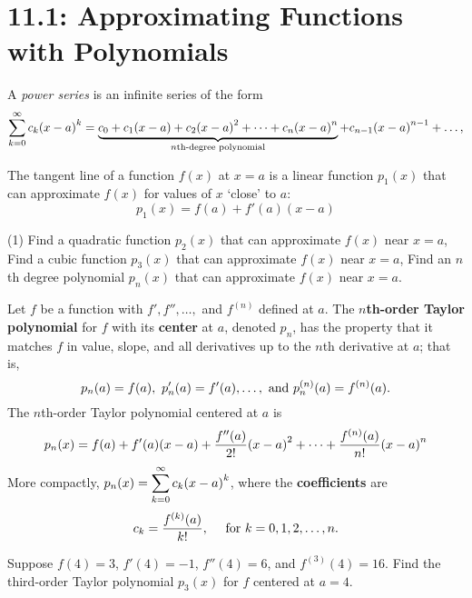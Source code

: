 \documentclass[../mathNotesPreamble]{subfiles}
\begin{document}
  \section{11.1: Approximating Functions with Polynomials}

  A \textit{power series} is an infinite series of the form
    \[\sum_{k=0}^\infty c_k{\left(x-a\right)}^k=\underbrace{c_0+c_1{\left(x-a\right)}+c_2{\left(x-a\right)}^2+\dots+c_n{\left(x-a\right)}^n}_{n\textnormal{th-degree polynomial}}+c_{n-1}{\left(x-a\right)}^{n-1}+\dots,\]
  \begin{ex*}
    The tangent line of a function $f(x)$ at $x=a$ is a linear function $p_1(x)$ that can approximate $f(x)$ for values of $x$ `close' to $a$:
      \[p_1(x)=f(a)+f'(a)(x-a)\]
    \begin{tasks}[after-item-skip=\stretch{1}, label=,item-indent=0pt](1)
      \task Find a quadratic function $p_2(x)$ that can approximate $f(x)$ near $x=a$,
      \task Find a cubic function $p_3(x)$ that can approximate $f(x)$ near $x=a$,
      \task Find an $n$th degree polynomial $p_n(x)$ that can approximate $f(x)$ near $x=a$.
    \end{tasks}

  \end{ex*}
  \pagebreak

  \begin{defn*}
    Let $f$ be a function with $f', f'', \dots,$ and $f^{(n)}$ defined at $a$. The \textbf{$n$th-order Taylor polynomial} for $f$ with its \textbf{center} at $a$, denoted $p_n$, has the property that it matches $f$ in value, slope, and all derivatives up to the $n$th derivative at $a$; that is,
      \[p_n(a)=f(a),\ p_n'(a)=f'(a),\dots,\textnormal{ and } p_n^{(n)}(a)=f^{(n)}(a).\]
    The $n$th-order Taylor polynomial centered at $a$ is
      \[p_n(x)=f(a)+f'(a){\left(x-a\right)}+\frac{f''(a)}{2!}{\left(x-a\right)}^2+\dots+\frac{f^{(n)}(a)}{n!}{\left(x-a\right)}^n\]
    More compactly, $\displaystyle p_n(x)=\sum_{k=0}^\infty c_k{\left(x-a\right)}^k$, where the \textbf{coefficients} are
      \[c_k=\frac{f^{(k)}(a)}{k!},\quad\textnormal{ for }k=0,1,2,\dots,n.\]
  \end{defn*}
  \begin{ex*}
    Suppose $f(4)=3$, $f'(4)=-1$, $f''(4)=6$, and $f^{(3)}(4)=16$. Find the third-order Taylor polynomial $p_3(x)$ for $f$ centered at $a=4$.
  \end{ex*}
  \pagebreak
\end{document}
